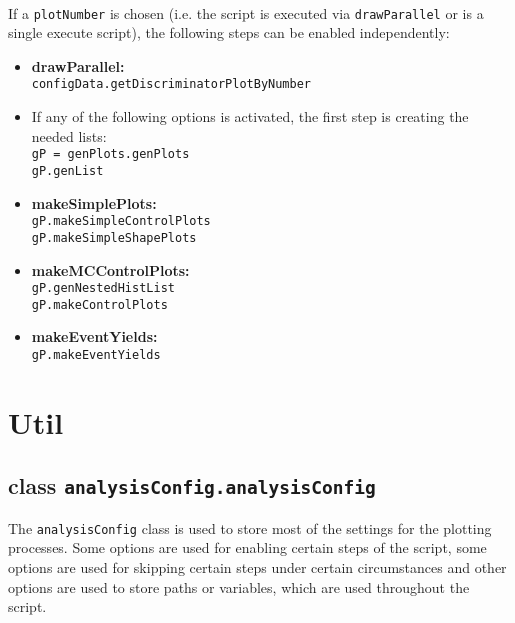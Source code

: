 \documentclass[12pt, a4paper]{article}
\begin{document}
~\\		
If a \texttt{plotNumber} is chosen (i.e. the script is executed via \texttt{drawParallel} or is a single execute script), the following steps can be enabled independently:
		\begin{itemize}
			\item \textbf{drawParallel:}\\
				\texttt{configData.getDiscriminatorPlotByNumber}
				
			\item If any of the following options is activated, the first step is creating the needed lists:\\
				\texttt{gP = genPlots.genPlots}\\
				\texttt{gP.genList}
				
			\item \textbf{makeSimplePlots:}\\
				\texttt{gP.makeSimpleControlPlots}\\
				\texttt{gP.makeSimpleShapePlots}
				
			\item \textbf{makeMCControlPlots:}\\
				\texttt{gP.genNestedHistList}\\
				\texttt{gP.makeControlPlots}
				
			\item \textbf{makeEventYields:}\\
				\texttt{gP.makeEventYields}
		\end{itemize}
		

\newpage
\section{Util}






\subsection{class \texttt{analysisConfig.analysisConfig}}
The \texttt{analysisConfig} class is used to store most of the settings for the plotting processes. Some options are used for enabling certain steps of the script, some options are used for skipping certain steps under certain circumstances and other options are used to store paths or variables, which are used throughout the script.
\end{document}
